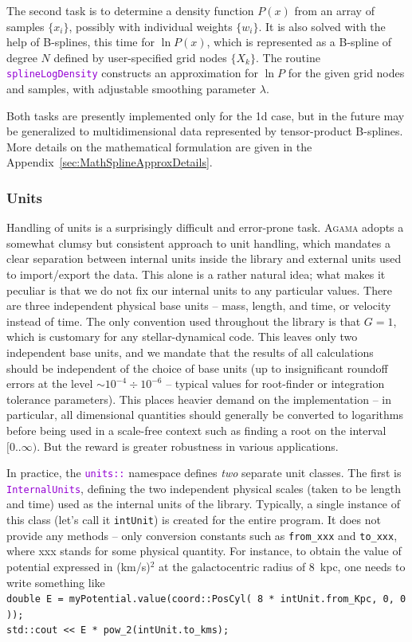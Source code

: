\documentclass[12pt]{article}
\newcommand{\Agama}{\textsc{Agama}\xspace}
\newcommand{\ttt}[1]{\textcolor{darkviolet}{\texttt{#1}}}
\begin{document}
The second task is to determine a density function $P(x)$ from an array of samples $\{x_i\}$, possibly with individual weights $\{w_i\}$. It is also solved with the help of B-splines, this time for $\ln P(x)$, which is represented as a B-spline of degree $N$ defined by user-specified grid nodes $\{X_k\}$. The routine \ttt{splineLogDensity} constructs an approximation for $\ln P$ for the given grid nodes and samples, with adjustable smoothing parameter $\lambda$.

Both tasks are presently implemented only for the 1d case, but in the future may be generalized to multidimensional data represented by tensor-product B-splines. More details on the mathematical formulation are given in the Appendix~\ref{sec:MathSplineApproxDetails}.

\subsubsection{Units}  \label{sec:Units}

Handling of units is a surprisingly difficult and error-prone task. \Agama adopts a somewhat clumsy but consistent approach to unit handling, which mandates a clear separation between internal units inside the library and external units used to import/export the data. This alone is a rather natural idea; what makes it peculiar is that we do not fix our internal units to any particular values. There are three independent physical base units -- mass, length, and time, or velocity instead of time. The only convention used throughout the library is that $G=1$, which is customary for any stellar-dynamical code. This leaves only two independent base units, and we mandate that the results of all calculations should be independent of the choice of base units (up to insignificant roundoff errors at the level $\sim 10^{-4}\div 10^{-6}$ -- typical values for root-finder or integration tolerance parameters). This places heavier demand on the implementation -- in particular, all dimensional quantities should generally be converted to logarithms before being used in a scale-free context such as finding a root on the interval $[0..\infty)$. But the reward is greater robustness in various applications.

In practice, the \ttt{units::} namespace defines \textit{two} separate unit classes. The first is \ttt{InternalUnits}, defining the two independent physical scales (taken to be length and time) used as the internal units of the library. Typically, a single instance of this class (let's call it \texttt{intUnit}) is created for the entire program. It does not provide any methods -- only conversion constants such as \texttt{from_xxx} and \texttt{to_xxx}, where xxx stands for some physical quantity. For instance, to obtain the value of potential expressed in (km/s)${}^2$ at the galactocentric radius of 8~kpc, one needs to write something like \\
\texttt{double E = myPotential.value(coord::PosCyl( 8 * intUnit.from_Kpc, 0, 0 ));}\\
\texttt{std::cout << E * pow_2(intUnit.to_kms);}
\end{document}
